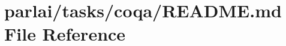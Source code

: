 \hypertarget{parlai_2tasks_2coqa_2README_8md}{}\section{parlai/tasks/coqa/\+R\+E\+A\+D\+ME.md File Reference}
\label{parlai_2tasks_2coqa_2README_8md}
